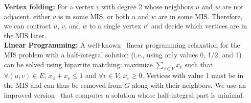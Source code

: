 \documentclass[twoside,leqno,twocolumn]{article}
\newif\ifFull
\begin{document}

\noindent\textbf{Vertex folding:} For a vertex $v$ with degree 2 whose neighbors $u$ and $w$ are not adjacent, either $v$ is in some MIS, or both $u$ and $w$ are in some MIS. Therefore, we can contract $u$, $v$, and $w$ to a single vertex $v'$ and decide which vertices are in the MIS later. \\

\ifFull
\noindent\textbf{Linear Programming:}
First introduced by Nemhauser and Trotter~\cite{nemhauser-1975} for the vertex packing problem, they present a linear programming relaxation with a half-integral solution (i.e., using only values 0, 1/2, and 1) which can be solved using bipartite matching. Their relaxation may be formulated for the independent set problem as follows: maximize $\sum_{v\in V}{x_v}$, such at for each edge $(u, v) \in E$, $x_u + x_v \leq 1$ and for each vertex $v \in V$, $x_v \geq 0$. Vertices with value 1 must be in the MIS, and therefore are added to the solution. We use the further improvement from Iwata, Oka, and Yoshida~\cite{iwata-2014}, which computes a solution whose half-integral part is minimal. \\
\else
\noindent\textbf{Linear Programming:}
A well-known~\cite{nemhauser-1975} linear programming relaxation for the MIS problem with a half-integral solution (i.e., using only values 0, 1/2, and 1) can be solved using bipartite matching: maximize $\sum_{v\in V}{x_v}$ such that $\forall (u, v) \in E$, $x_u + x_v \leq 1$ and $\forall v \in V$, $x_v \geq 0$. Vertices with value 1 must be in the MIS and can thus be removed from $G$ along with their neighbors. We use an improved version~\cite{iwata-2014} that computes a solution whose half-integral part is minimal.\\ %
\fi
\end{document}

